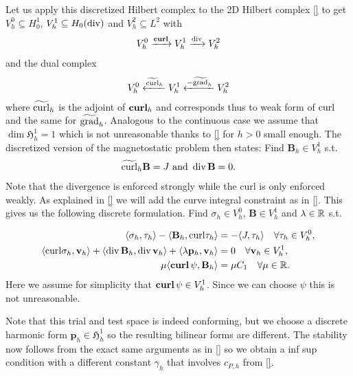 \documentclass[../master_thesis.tex]{subfiles}
\begin{document}
Let us apply this discretized Hilbert complex to the 2D Hilbert complex \ref{}
to get $V^0_h \subseteq H^1_0$, $V^1_h \subseteq H_0(\operatorname{div})$ and $V^2_h \subseteq L^2$
with 
\begin{align*}
    V^0_h \xrightarrow{\veccurl} V^1_h \xrightarrow{\diver} V^2_h
\end{align*}
and the dual complex 
\begin{align*}
    V^0_h \xleftarrow{\widetilde{\operatorname{curl}}_h} V^1_h \xleftarrow{-\widetilde{\operatorname{grad}}_h} V^2_h
\end{align*}
where $\widetilde{\operatorname{curl}}_h$ is the adjoint of $\veccurl_h$ and corresponds thus to
weak form of $\operatorname{curl}$ and the same for $\widetilde{\operatorname{grad}}_h$.
Analogous to the continuous case we assume that $\dim \mathfrak{H}_h^1 = 1$ 
which is not unreasonable thanks to \ref{} for $h>0$ small enough.
The discretized version of the magnetostatic problem then states: 
Find $\mathbf{B}_h \in V_h^1$ s.t.
\begin{align*}
    \widetilde{\operatorname{curl}}_h \mathbf{B} = J \text{ and }
    \operatorname{div} \mathbf{B} = 0.
\end{align*}
Note that the divergence is enforced strongly while the curl is only enforced weakly.
As explained in \ref{} we will add the curve integral constraint as in \ref{}.
This gives us the following discrete formulation. Find 
$\sigma_h \in V_h^0$, $\mathbf{B} \in V_h^1$ and $\lambda \in \mathbb{R}$ s.t.

\begin{align*}
    \langle \sigma_h, \tau_h \rangle - \langle \mathbf{B}_h, \mathbf{\curl}\tau_h \rangle 
    &=  -\langle J, \tau_h \rangle \quad \forall \tau_h \in V_h^0, 
    \\ \langle \mathbf{\curl}\sigma_h, \mathbf{v}_h \rangle + \langle \diver \mathbf{B}_h, \diver \mathbf{v}_h \rangle 
    + \langle \lambda \mathbf{p}_h, \mathbf{v}_h \rangle 
    &= 0 \quad \forall \mathbf{v}_h \in V^1_h, 
    \\ \mu \langle \bm{\curl} \psi, \mathbf{B}_h \rangle &= \mu C_1 \quad \forall \mu \in \real.
\end{align*}
Here we assume for simplicity that $\veccurl \psi \in V_h^1$. Since 
we can choose $\psi$ this is not unreasonable. 

Note that this trial and test space is indeed conforming, but we choose a discrete harmonic form 
$\mathbf{p}_h \in \mathfrak{H}^1_h$ so the resulting bilinear forms are different. 
The stability now follows from the exact same arguments as in \ref{} 
so we obtain a inf sup condition with a different constant $\gamma_h$ that involves 
$c_{P,h}$ from \ref{}. 
\end{document}
